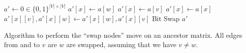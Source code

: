 \begin{algorithm}
    \begin{algorithmic}[1]
            \State $a' \leftarrow 0 \in \{0,1\}^{|V| \times |V|}$
                    \State $a'[x] \leftarrow a[w]$
                    \State $a'[x] \leftarrow a[v]$
                \Else
                    \State $a'[x] \leftarrow a[x]$
                \EndIf
                \State $a'[x][v], a'[x][w] \leftarrow a'[x][w], a'[x][v]$ \Comment Bit Swap
            \EndFor
            \State \Return $a'$
        \EndFunction
    \end{algorithmic}
    \caption{Algorithm to perform the ``swap nodes'' move on an ancestor matrix. All edges from and to $v$ are $w$ are swapped, assuming that we have $v \neq w$.}
    \label{alg:am_swap_nodes}
\end{algorithm}

